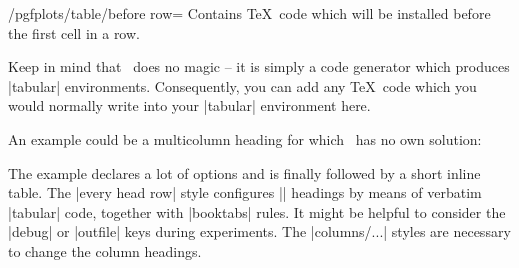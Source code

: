 \begin{key}{/pgfplots/table/before row=}	
	Contains \TeX\ code which will be installed before the first cell in a row.

	Keep in mind that \PGFPlotstable\ does no magic -- it is simply a code generator which produces |tabular| environments. Consequently, you can add any \TeX\ code which you would normally write into your |tabular| environment here.

	An example could be a multicolumn heading for which \PGFPlotstable\ has no own solution:
\begin{codeexample}[]
\end{codeexample}
    \noindent The example declares a lot of options and is finally followed by a short inline table. The |every head row| style configures |\multicolumn| headings by means of verbatim |tabular| code, together with |booktabs| rules. It might be helpful to consider the |debug| or |outfile| keys during experiments. The |columns/...| styles are necessary to change the column headings. 



\end{key}
